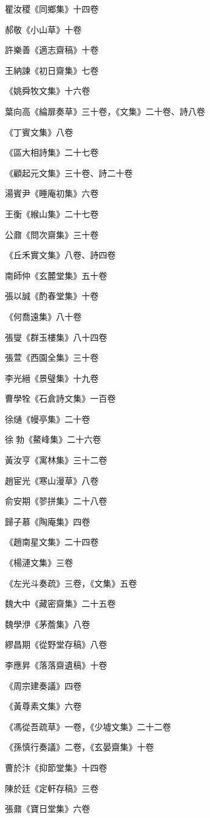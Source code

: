 瞿汝稷《同鄉集》十四卷

郝敬《小山草》十卷

許樂善《適志齋稿》十卷

王納諫《初日齋集》七卷

《姚舜牧文集》十六卷

葉向高《綸扉奏草》三十卷，《文集》二十卷、詩八卷

《丁賓文集》八卷

《區大相詩集》二十七卷

《顧起元文集》三十卷、詩二十卷

湯賓尹《睡庵初集》六卷

王衡《緱山集》二十七卷

公鼐《問次齋集》三十卷

《丘禾實文集》八卷、詩四卷

南師仲《玄麓堂集》五十卷

張以誠《酌春堂集》十卷

《何喬遠集》八十卷

張燮《群玉樓集》八十四卷

張萱《西園全集》三十卷

李光縉《景璧集》十九卷

曹學牷《石倉詩文集》一百卷

徐熥《幔亭集》二十卷

徐勃《鰲峰集》二十六卷

黃汝亨《寓林集》三十二卷

趙宦光《寒山漫草》八卷

俞安期《翏拼集》二十八卷

歸子慕《陶庵集》四卷

《趙南星文集》二十四卷

《楊漣文集》三卷

《左光斗奏疏》三卷，《文集》五卷

魏大中《藏密齋集》二十五卷

魏學洢《茅薝集》八卷

繆昌期《從野堂存稿》八卷

李應昇《落落齋遺稿》十卷

《周宗建奏議》四卷

《黃尊素文集》六卷

《馮從吾疏草》一卷，《少墟文集》二十二卷

《孫慎行奏議》二卷，《玄晏齋集》十卷

曹於汴《抑節堂集》十四卷

陳於廷《定軒存稿》三卷

張鼐《寶日堂集》六卷


